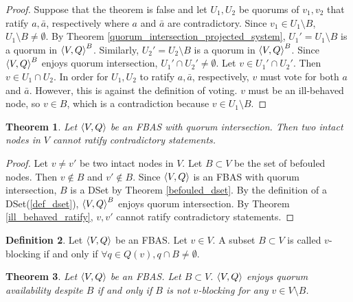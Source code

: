 \documentclass[12pt, psamsfonts]{amsart}
\newtheorem{thm}{Theorem}[section]
\theoremstyle{definition}
\newtheorem{defn}[thm]{Definition}
\theoremstyle{remark}
\numberwithin{equation}{section}
\begin{document}
\begin{proof}
    Suppose that the theorem is false and let $U_1, U_2$ be quorums of $v_1, v_2$ that ratify $a, \bar{a}$, respectively where $a$ and $\bar{a}$ are contradictory.
    Since $v_1 \in U_1 \setminus B$,  $U_1 \setminus B \ne \emptyset$.
    By Theorem \ref{quorum_intersection_projected_system}, $U_1' = U_1 \setminus B$ is a quorum in $\ev{V, Q}^B$.
    Similarly, $U_2' = U_2 \setminus B$ is a quorum in $\ev{V, Q}^B$.
    Since $\ev{V, Q}^B$ enjoys quorum intersection, $U_1' \cap U_2' \ne \emptyset$.
    Let $v \in U_1' \cap U_2'$.
    Then $v \in U_1 \cap U_2$.
    In order for $U_1, U_2$ to ratify $a, \bar{a}$, respectively, $v$ must vote for both $a$ and $\bar{a}$.
    However, this is against the definition of voting.
    $v$ must be an ill-behaved node, so $v \in B$, which is a contradiction because $v \in U_1 \setminus B$.
\end{proof}

\begin{thm}
    Let $\ev{V, Q}$ be an FBAS with quorum intersection.
    Then two intact nodes in $V$ cannot ratify contradictory statements.
\end{thm}

\begin{proof}
    Let $v \ne v'$ be two intact nodes in $V$.
    Let $B \subset V$ be the set of befouled nodes.
    Then $v \notin B$ and $v' \notin B$.
    Since $\ev{V, Q}$ is an FBAS with quorum intersection, $B$ is a DSet by Theorem \ref{befouled_dset}.
    By the definition of a DSet(\ref{def_dset}), $\ev{V, Q}^B$ enjoys quorum intersection.
    By Theorem \ref{ill_behaved_ratify}, $v, v'$ cannot ratify contradictory statements.
\end{proof}

\begin{defn}
    Let $\ev{V, Q}$ be an FBAS.
    Let $v \in V$.
    A subset $B \subset V$ is called $v$-blocking if and only if $\forall q \in Q(v), q \cap B \ne \emptyset$.
\end{defn}

\begin{thm}\label{quorum_availability_v_blocking}
    Let $\ev{V, Q}$ be an FBAS.
    Let $B \subset V$.
    $\ev{V, Q}$ enjoys quorum availability despite $B$ if and only if $B$ is not $v$-blocking for any $v \in V \setminus B$.
\end{thm}
\end{document}
